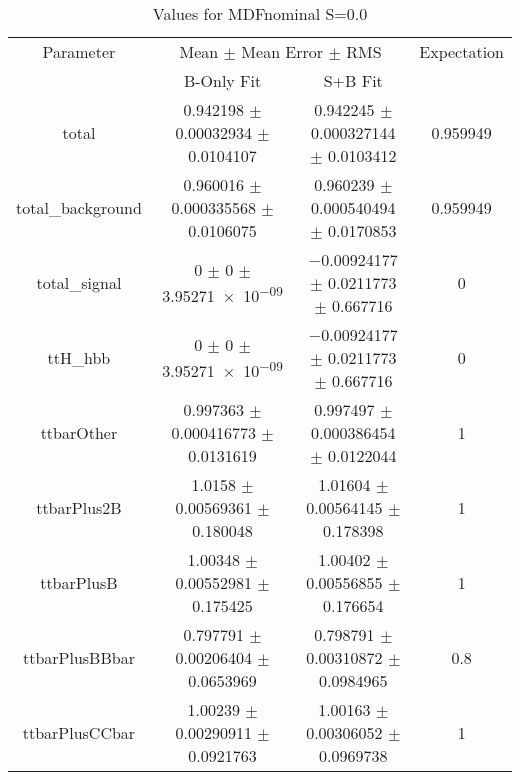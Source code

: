 \begin{table}
\centering
\caption{Values for MDFnominal S=0.0}
\begin{tabular}{cccc}
\toprule
Parameter & \multicolumn{2}{c}{Mean $\pm$ Mean Error $\pm$ RMS} & Expectation\\
 & B-Only Fit & S+B Fit & \\
\midrule
total & \num{0.942198} $\pm$ \num{0.00032934} $\pm$ \num{0.0104107} & \num{0.942245} $\pm$ \num{0.000327144} $\pm$ \num{0.0103412} & \num{0.959949}\\
total\_background & \num{0.960016} $\pm$ \num{0.000335568} $\pm$ \num{0.0106075} & \num{0.960239} $\pm$ \num{0.000540494} $\pm$ \num{0.0170853} & \num{0.959949}\\
total\_signal & \num{0} $\pm$ \num{0} $\pm$ \num{3.95271e-09} & \num{-0.00924177} $\pm$ \num{0.0211773} $\pm$ \num{0.667716} & \num{0}\\
ttH\_hbb & \num{0} $\pm$ \num{0} $\pm$ \num{3.95271e-09} & \num{-0.00924177} $\pm$ \num{0.0211773} $\pm$ \num{0.667716} & \num{0}\\
ttbarOther & \num{0.997363} $\pm$ \num{0.000416773} $\pm$ \num{0.0131619} & \num{0.997497} $\pm$ \num{0.000386454} $\pm$ \num{0.0122044} & \num{1}\\
ttbarPlus2B & \num{1.0158} $\pm$ \num{0.00569361} $\pm$ \num{0.180048} & \num{1.01604} $\pm$ \num{0.00564145} $\pm$ \num{0.178398} & \num{1}\\
ttbarPlusB & \num{1.00348} $\pm$ \num{0.00552981} $\pm$ \num{0.175425} & \num{1.00402} $\pm$ \num{0.00556855} $\pm$ \num{0.176654} & \num{1}\\
ttbarPlusBBbar & \num{0.797791} $\pm$ \num{0.00206404} $\pm$ \num{0.0653969} & \num{0.798791} $\pm$ \num{0.00310872} $\pm$ \num{0.0984965} & \num{0.8}\\
ttbarPlusCCbar & \num{1.00239} $\pm$ \num{0.00290911} $\pm$ \num{0.0921763} & \num{1.00163} $\pm$ \num{0.00306052} $\pm$ \num{0.0969738} & \num{1}\\
\bottomrule
\end{tabular}
\end{table}